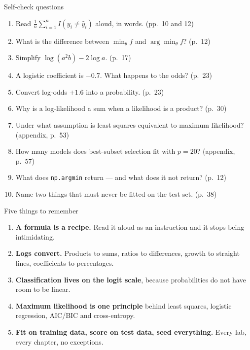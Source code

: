 \documentclass[aspectratio=169,11pt]{beamer}
\begin{document}
\begin{frame}{Self-check questions}
  \begin{enumerate}
    \item Read $\frac{1}{n}\sum_{i=1}^{n} I(y_i \ne \hat y_i)$ aloud, in words.
          (pp.~10 and 12)
    \item What is the difference between $\min_\theta f$ and
          $\arg\min_\theta f$? (p.~12)
    \item Simplify $\log(a^2 b) - 2\log a$. (p.~17)
    \item A logistic coefficient is $-0.7$. What happens to the odds? (p.~23)
    \item Convert log-odds $+1.6$ into a probability. (p.~23)
    \item Why is a log-likelihood a sum when a likelihood is a product? (p.~30)
    \item Under what assumption is least squares equivalent to maximum
          likelihood? (appendix, p.~53)
    \item How many models does best-subset selection fit with $p = 20$?
          (appendix, p.~57)
    \item What does \texttt{np.argmin} return --- and what does it not
          return? (p.~12)
    \item Name two things that must never be fitted on the test set. (p.~38)
  \end{enumerate}
\end{frame}

\begin{frame}{Five things to remember}
  \begin{enumerate}
    \item \textbf{A formula is a recipe.} Read it aloud as an instruction and
          it stops being intimidating.
    \item \textbf{Logs convert.} Products to sums, ratios to differences,
          growth to straight lines, coefficients to percentages.
    \item \textbf{Classification lives on the logit scale}, because
          probabilities do not have room to be linear.
    \item \textbf{Maximum likelihood is one principle} behind least squares,
          logistic regression, AIC/BIC and cross-entropy.
    \item \textbf{Fit on training data, score on test data, seed everything.}
          Every lab, every chapter, no exceptions.
  \end{enumerate}
\end{frame}
\end{document}
